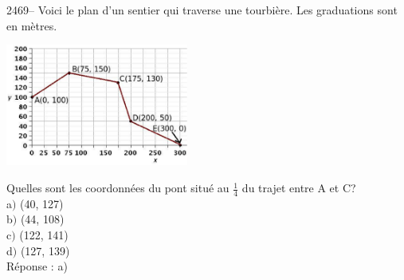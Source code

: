 \documentclass[letterpaper, 12pt]{article}
\begin{document}
2469--  Voici le plan d'un sentier qui traverse une tourbi\`ere. Les graduations sont en m\`etres. \\
\begin{center}
 \includegraphics[width=6cm,bb=14 14 531 362]{Q2468.eps}
\end{center}
Quelles sont les coordonn\'ees du pont situ\'e au $\frac{1}{4}$ du trajet entre A et C?\\

a$)$ (40, 127)\\
b$)$ (44, 108)\\
c$)$ (122, 141)\\
d$)$ (127, 139)\\

R\'eponse : a)\\
\end{document}
